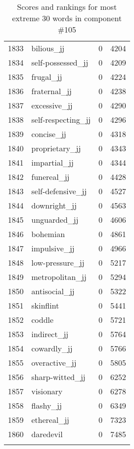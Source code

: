 \begin{longtable}[!htbp]{| rlr@{.}l |}
    1833 & bilious\_jj & 0 & 4204 \\
    1834 & self-possessed\_jj & 0 & 4209 \\
    1835 & frugal\_jj & 0 & 4224 \\
    1836 & fraternal\_jj & 0 & 4238 \\
    1837 & excessive\_jj & 0 & 4290 \\
    1838 & self-respecting\_jj & 0 & 4296 \\
    1839 & concise\_jj & 0 & 4318 \\
    1840 & proprietary\_jj & 0 & 4343 \\
    1841 & impartial\_jj & 0 & 4344 \\
    1842 & funereal\_jj & 0 & 4428 \\
    1843 & self-defensive\_jj & 0 & 4527 \\
    1844 & downright\_jj & 0 & 4563 \\
    1845 & unguarded\_jj & 0 & 4606 \\
    1846 & bohemian & 0 & 4861 \\
    1847 & impulsive\_jj & 0 & 4966 \\
    1848 & low-pressure\_jj & 0 & 5217 \\
    1849 & metropolitan\_jj & 0 & 5294 \\
    1850 & antisocial\_jj & 0 & 5322 \\
    1851 & skinflint & 0 & 5441 \\
    1852 & coddle & 0 & 5721 \\
    1853 & indirect\_jj & 0 & 5764 \\
    1854 & cowardly\_jj & 0 & 5766 \\
    1855 & overactive\_jj & 0 & 5805 \\
    1856 & sharp-witted\_jj & 0 & 6252 \\
    1857 & visionary & 0 & 6278 \\
    1858 & flashy\_jj & 0 & 6349 \\
    1859 & ethereal\_jj & 0 & 7323 \\
    1860 & daredevil & 0 & 7485 \\
    \hline
    \caption{Scores and rankings for most extreme 30 words in component \#105} \\
\end{longtable}
